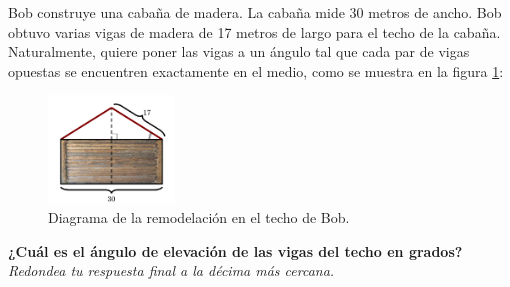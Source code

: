 Bob construye una cabaña de madera. La cabaña mide 30 metros de ancho. Bob obtuvo
varias vigas de madera de 17 metros de largo para el techo de la cabaña.
Naturalmente, quiere poner las vigas a un ángulo tal que cada par de vigas opuestas se
encuentren exactamente en el medio, como se muestra en la figura \ref{fig:techo1}:
\begin{figure}[H]
    \begin{center}
        \includegraphics[width=0.3\textwidth]{../images/techo1.png}
    \end{center}
    \caption{Diagrama de la remodelación en el techo de Bob.}
    \label{fig:techo1}
\end{figure}
\textbf{¿Cuál es el ángulo de elevación de las vigas del techo en grados?}\\
\textit{Redondea tu respuesta final a la décima más cercana.}